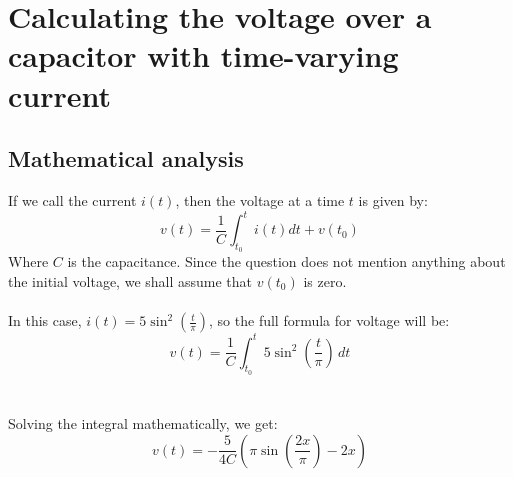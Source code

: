 \documentclass[10pt,fleqn,a4paper]{article} %
\renewcommand{\=}[1]{\stackrel{#1}{=}} %
\theoremstyle{definition}
\theoremstyle{remark}
\begin{document}
\section{Calculating the voltage over a capacitor with time-varying current}
\subsection{Mathematical analysis}
If we call the current $ i(t)$, then the voltage at a time $t$ is given by:
\[
v(t) = \frac{1}{C} \int_{t_0}^t i(t) dt + v(t_0)
\]
Where $C$ is the capacitance. Since the question does not mention anything about the initial voltage, we shall assume that $v(t_0)$ is zero.
\\\\
In this case, $i(t) = 5 \sin^2{(\frac{t}{\pi})}$, so the full formula for voltage will be:
\[
v(t) = \frac{1}{C} \int_{t_0}^t 5 \sin^2{\left(\frac{t}{\pi}\right)}  \, dt
\]
\\\\
Solving the integral mathematically, we get:
\[
v(t) = - \frac{5}{4C} (\pi \sin{\left(\frac{2x}{\pi}\right)} - 2x)
\]
\end{document}
